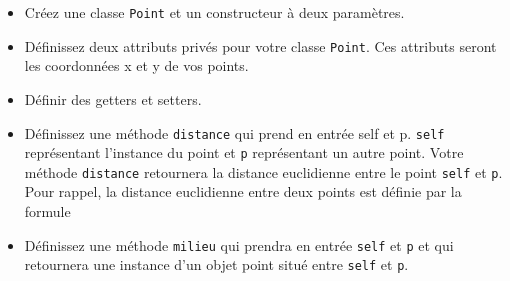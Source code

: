 \begin{Exercice}[20 minutes]
    \begin{itemize}
        \item Créez une classe \lstinline{Point} et un constructeur à deux paramètres.
        \item Définissez deux attributs privés pour votre classe \lstinline{Point}. Ces attributs seront les coordonnées x et y de vos points.
        \item Définir des getters et setters.
        \item Définissez une méthode \lstinline{distance} qui prend en entrée self et p. \lstinline{self} représentant l'instance du point et \lstinline{p} représentant un autre point. Votre méthode \lstinline{distance} retournera la distance euclidienne entre le point \lstinline{self} et \lstinline{p}. Pour rappel, la distance euclidienne entre deux points est définie par la formule %
        \item Définissez une méthode \lstinline{milieu} qui prendra en entrée \lstinline{self} et \lstinline{p} et qui retournera une instance d'un objet point situé entre \lstinline{self} et \lstinline{p}.
    \end{itemize}
    
\end{Exercice}



